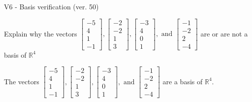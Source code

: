 \begin{exercise}
  \begin{exerciseTitle}V6 - Basis verification (ver. 50)\end{exerciseTitle}
  \begin{exerciseStatement}
    Explain why the vectors \(\left[\begin{array}{r}
-5 \\
4 \\
1 \\
-1
\end{array}\right] , \left[\begin{array}{r}
-2 \\
-2 \\
1 \\
3
\end{array}\right] , \left[\begin{array}{r}
-3 \\
4 \\
0 \\
1
\end{array}\right] , \text{ and } \left[\begin{array}{r}
-1 \\
-2 \\
2 \\
-4
\end{array}\right]\) are or are not a basis of \(\mathbb{R}^4\)	


  \end{exerciseStatement}
  \begin{exerciseAnswer}
   The vectors \(\left[\begin{array}{r}
-5 \\
4 \\
1 \\
-1
\end{array}\right] , \left[\begin{array}{r}
-2 \\
-2 \\
1 \\
3
\end{array}\right] , \left[\begin{array}{r}
-3 \\
4 \\
0 \\
1
\end{array}\right] , \text{ and } \left[\begin{array}{r}
-1 \\
-2 \\
2 \\
-4
\end{array}\right]\) 
  	 are  a basis of \(\mathbb{R}^4\).
  


  \end{exerciseAnswer}
\end{exercise}